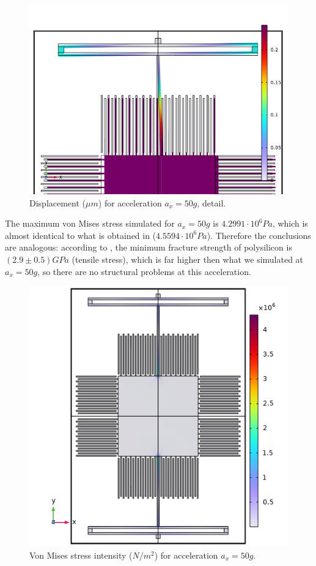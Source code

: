 \documentclass[lettersize,journal]{IEEEtran}
\begin{document}
    \begin{figure}[!h]
        \centering
        \includegraphics[width=1.0\linewidth]{displacement_ax_detail}
        \caption{Displacement (\(\mu m\)) for acceleration \(a_x=50g\), detail.}
        \label{fig:disp_ax_det}
    \end{figure}
    
    The maximum von Mises stress simulated for \(a_x=50g\) is \(4.2991\cdot10^6Pa\), which is almost identical to what is obtained in \cite{original} (\(4.5594\cdot10^6Pa\)). Therefore the conclusions are analogous: according to \cite{fracture}, the minimum fracture strength of polysilicon is \((2.9\pm 0.5)GPa\) (tensile stress), which is far higher then what we simulated at \(a_x=50g\), so there are no structural problems at this acceleration.
    
    \begin{figure}[!h]
        \centering
        \includegraphics[width=1.0\linewidth]{stress_ax}
        \caption{Von Mises stress intensity (\(N/m^2\)) for acceleration \(a_x=50g\).}
        \label{fig:stress_ax}
    \end{figure}
    
\end{document}
